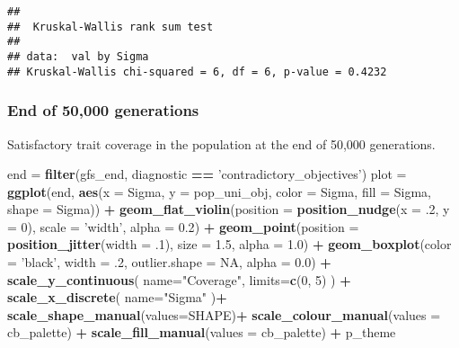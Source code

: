 \documentclass[]{book}
\newenvironment{Shaded}{\begin{snugshade}}{\end{snugshade}}
\newcommand{\DataTypeTok}[1]{\textcolor[rgb]{0.13,0.29,0.53}{#1}}
\newcommand{\DecValTok}[1]{\textcolor[rgb]{0.00,0.00,0.81}{#1}}
\newcommand{\FloatTok}[1]{\textcolor[rgb]{0.00,0.00,0.81}{#1}}
\newcommand{\KeywordTok}[1]{\textcolor[rgb]{0.13,0.29,0.53}{\textbf{#1}}}
\newcommand{\NormalTok}[1]{#1}
\newcommand{\OperatorTok}[1]{\textcolor[rgb]{0.81,0.36,0.00}{\textbf{#1}}}
\newcommand{\OtherTok}[1]{\textcolor[rgb]{0.56,0.35,0.01}{#1}}
\newcommand{\StringTok}[1]{\textcolor[rgb]{0.31,0.60,0.02}{#1}}
\begin{document}
\begin{verbatim}
## 
##  Kruskal-Wallis rank sum test
## 
## data:  val by Sigma
## Kruskal-Wallis chi-squared = 6, df = 6, p-value = 0.4232
\end{verbatim}

\hypertarget{end-of-50000-generations-14}{%
\subsubsection{End of 50,000 generations}\label{end-of-50000-generations-14}}

Satisfactory trait coverage in the population at the end of 50,000 generations.

\begin{Shaded}
\begin{Highlighting}[]
\NormalTok{end =}\StringTok{ }\KeywordTok{filter}\NormalTok{(gfs_end, diagnostic }\OperatorTok{==}\StringTok{ 'contradictory_objectives'}\NormalTok{)}
\NormalTok{plot =}\StringTok{ }\KeywordTok{ggplot}\NormalTok{(end, }\KeywordTok{aes}\NormalTok{(}\DataTypeTok{x =}\NormalTok{ Sigma, }\DataTypeTok{y =}\NormalTok{ pop_uni_obj, }\DataTypeTok{color =}\NormalTok{ Sigma, }\DataTypeTok{fill =}\NormalTok{ Sigma, }\DataTypeTok{shape =}\NormalTok{ Sigma)) }\OperatorTok{+}
\StringTok{  }\KeywordTok{geom_flat_violin}\NormalTok{(}\DataTypeTok{position =} \KeywordTok{position_nudge}\NormalTok{(}\DataTypeTok{x =} \FloatTok{.2}\NormalTok{, }\DataTypeTok{y =} \DecValTok{0}\NormalTok{), }\DataTypeTok{scale =} \StringTok{'width'}\NormalTok{, }\DataTypeTok{alpha =} \FloatTok{0.2}\NormalTok{) }\OperatorTok{+}
\StringTok{  }\KeywordTok{geom_point}\NormalTok{(}\DataTypeTok{position =} \KeywordTok{position_jitter}\NormalTok{(}\DataTypeTok{width =} \FloatTok{.1}\NormalTok{), }\DataTypeTok{size =} \FloatTok{1.5}\NormalTok{, }\DataTypeTok{alpha =} \FloatTok{1.0}\NormalTok{) }\OperatorTok{+}
\StringTok{  }\KeywordTok{geom_boxplot}\NormalTok{(}\DataTypeTok{color =} \StringTok{'black'}\NormalTok{, }\DataTypeTok{width =} \FloatTok{.2}\NormalTok{, }\DataTypeTok{outlier.shape =} \OtherTok{NA}\NormalTok{, }\DataTypeTok{alpha =} \FloatTok{0.0}\NormalTok{) }\OperatorTok{+}
\StringTok{  }\KeywordTok{scale_y_continuous}\NormalTok{(}
    \DataTypeTok{name=}\StringTok{"Coverage"}\NormalTok{,}
    \DataTypeTok{limits=}\KeywordTok{c}\NormalTok{(}\DecValTok{0}\NormalTok{, }\DecValTok{5}\NormalTok{)}
\NormalTok{  ) }\OperatorTok{+}
\StringTok{  }\KeywordTok{scale_x_discrete}\NormalTok{(}
    \DataTypeTok{name=}\StringTok{"Sigma"}
\NormalTok{  )}\OperatorTok{+}
\StringTok{  }\KeywordTok{scale_shape_manual}\NormalTok{(}\DataTypeTok{values=}\NormalTok{SHAPE)}\OperatorTok{+}
\StringTok{  }\KeywordTok{scale_colour_manual}\NormalTok{(}\DataTypeTok{values =}\NormalTok{ cb_palette) }\OperatorTok{+}
\StringTok{  }\KeywordTok{scale_fill_manual}\NormalTok{(}\DataTypeTok{values =}\NormalTok{ cb_palette) }\OperatorTok{+}
\StringTok{  }\NormalTok{p_theme}


\end{Highlighting}
\end{Shaded}
\end{document}
